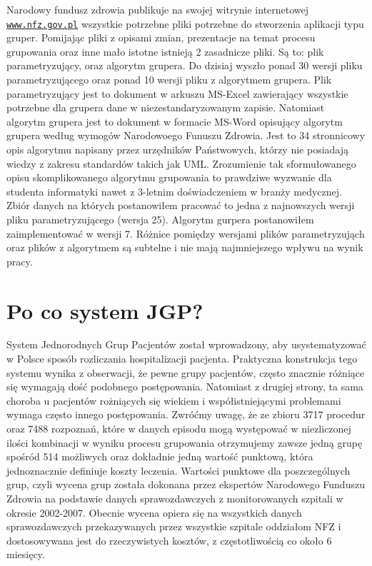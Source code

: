 Narodowy fundusz zdrowia publikuje na swojej witrynie internetowej \underline{\texttt{www.nfz.gov.pl}} wszystkie potrzebne pliki potrzebne do stworzenia aplikacji typu gruper. Pomijając pliki z opisami zmian, prezentacje na temat procesu grupowania oraz inne mało istotne istnieją 2 zasadnicze pliki. Są to: plik parametryzujący, oraz algorytm grupera. Do dzisiaj wyszło ponad 30 wersji pliku parametryzującego oraz ponad 10 wersji pliku z algorytmem grupera.
Plik parametryzujący jest to dokument w arkuszu MS-Excel zawierający wszystkie potrzebne dla grupera dane w niezestandaryzowanym zapisie. Natomiast algorytm grupera jest to dokument w formacie MS-Word opisujący algorytm grupera według wymogów Narodowoego Funuszu Zdrowia. Jest to 34 stronnicowy opis algorytmu napisany przez urzędników Państwowych, którzy nie posiadają wiedzy z zakresu standardów takich jak UML. Zrozumienie tak sformułowanego opisu skomplikowanego algorytmu grupowania to prawdziwe wyzwanie dla studenta informatyki nawet z 3-letnim doświadczeniem w branży medycznej. Zbiór danych na których postanowiłem pracować to jedna z najnowszych wersji pliku parametryzującego (wersja 25). Algorytm gurpera postanowiłem zaimplementować w wersji 7. Różnice pomiędzy wersjami plików parametryzująch oraz plików z algorytmem są subtelne i nie mają najmniejszego wpływu na wynik pracy.


\section{Po co system JGP?}
\label{sec:poCoJGP}

System Jednorodnych Grup Pacjentów został wprowadzony, aby usystematyzować w Polsce sposób rozliczania hospitalizacji pacjenta. Praktyczna konstrukcja tego systemu wynika z obserwacji, że pewne grupy pacjentów, często znacznie różniące się wymagają dość podobnego postępowania. Natomiast z drugiej strony, ta sama choroba u pacjentów rożniących się wiekiem i współistniejącymi problemami wymaga często innego postępowania.
Zwróćmy uwagę, że ze zbioru 3717 procedur oraz 7488 rozpoznań, które w danych episodu mogą występować w niezliczonej ilości kombinacji w wyniku procesu grupowania otrzymujemy zawsze jedną grupę spośród 514 możliwych oraz dokładnie jedną wartość punktową, która jednoznacznie definiuje koszty leczenia.
Wartości punktowe dla poszczególnych grup, czyli wycena grup została dokonana przez ekspertów Narodowego Funduszu Zdrowia na podstawie danych sprawozdawczych z monitorowanych szpitali w okresie 2002-2007. Obecnie wycena opiera się na wszystkich danych sprawozdawczych przekazywanych przez wszystkie szpitale oddziałom NFZ i dostosowywana jest do rzeczywistych kosztów, z częstotliwością co około 6 miesięcy.


